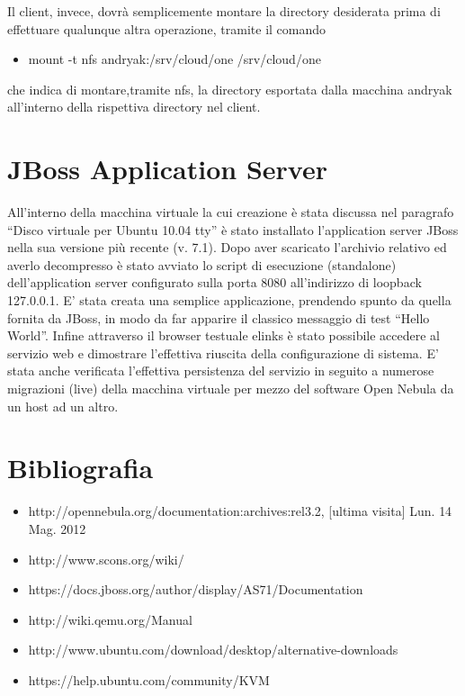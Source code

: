 \documentclass[	
	DIV=calc,
	paper=a4,
	fontsize=11pt,
	onecolumn
]{scrartcl} %
\begin{document}
Il client, invece, dovrà semplicemente montare la directory desiderata prima di effettuare qualunque altra operazione, tramite il comando
\begin{itemize}
	\item mount -t nfs andryak:/srv/cloud/one /srv/cloud/one
\end{itemize}
che indica di montare,tramite nfs, la directory esportata dalla macchina andryak all'interno della rispettiva directory nel client.

\section*{JBoss Application Server}
All'interno della macchina virtuale la cui creazione è stata discussa nel paragrafo ``Disco virtuale per Ubuntu 10.04 tty'' è stato installato l'application server JBoss nella sua versione più recente (v. 7.1). Dopo aver scaricato l'archivio relativo ed averlo decompresso è stato avviato lo script di esecuzione (standalone) dell'application server configurato sulla porta 8080 all'indirizzo di loopback 127.0.0.1. E' stata creata una semplice applicazione, prendendo spunto da quella fornita da JBoss, in modo da far apparire il classico messaggio di test ``Hello World''. Infine attraverso il browser testuale elinks è stato possibile accedere al servizio web e dimostrare l'effettiva riuscita della configurazione di sistema. E' stata anche verificata l'effettiva persistenza del servizio in seguito a numerose migrazioni (live) della macchina virtuale per mezzo del software Open Nebula da un host ad un altro.

\section*{Bibliografia}

\begin{itemize}
	\item http://opennebula.org/documentation:archives:rel3.2, [ultima visita] Lun. 14 Mag. 2012 
	\item http://www.scons.org/wiki/
	\item https://docs.jboss.org/author/display/AS71/Documentation
	\item http://wiki.qemu.org/Manual
	\item http://www.ubuntu.com/download/desktop/alternative-downloads
	\item https://help.ubuntu.com/community/KVM
\end{itemize}
\end{document}
